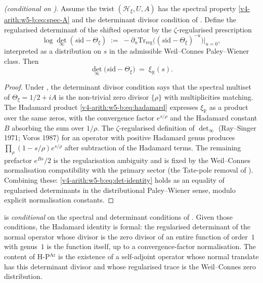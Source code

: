 \begin{proposition}
\label{v4-arith:w5-b:prop:det-formal}
\ClaimStatusProvedHere \emph{(conditional on
)}. Assume the twist
\((\mathcal{H}_{\xi},U,A)\) has the spectral property
\eqref{v4-arith:w5-b:eq:spec-A} and the determinant divisor condition
of . Define the regularised determinant
of the shifted operator by the \(\zeta\)-regularised prescription
\[
\log\det_{\infty}(s\mathrm{id}-\Theta_{\xi})\;:=\;-\partial_{u}\mathrm{Tr}_{\mathrm{reg}}\bigl((s\mathrm{id}-\Theta_{\xi})^{-u}\bigr)\Big|_{u=0},
\]
interpreted as a distribution on \(s\) in the admissible Weil--Connes
Paley--Wiener class. Then
\begin{equation}
\label{v4-arith:w5-b:eq:det-identity}
\det_{\infty}\bigl(s\mathrm{id}-\Theta_{\xi}\bigr)\;=\;\xi_{\mathbb R}(s).
\end{equation}
\end{proposition}

\begin{proof}
Under
, the determinant divisor
condition says that the spectral multiset of
\(\Theta_{\xi}=1/2+iA\) is the non-trivial zero divisor
\(\{\rho\}\) with multiplicities matching. The Hadamard product
\eqref{v4-arith:w5-b:eq:hadamard} expresses \(\xi_{\mathbb R}\) as a
product over the same zeros, with the convergence factor
\(e^{s/\rho}\) and the Hadamard constant \(B\) absorbing the sum over
\(1/\rho\). The \(\zeta\)-regularised definition of \(\det_{\infty}\)
(Ray--Singer 1971; Voros 1987) for an operator with positive
Hadamard genus produces
\(\prod_{\rho}(1-s/\rho)e^{s/\rho}\) after subtraction of the
Hadamard terms. The remaining prefactor \(e^{Bs}/2\) is the
regularisation ambiguity and is fixed by the Weil--Connes
normalisation compatibility with the primary sector (the Tate-pole
removal of ). Combining these:
\eqref{v4-arith:w5-b:eq:det-identity} holds as an equality of
regularised determinants in the distributional Paley--Wiener sense,
modulo explicit normalisation constants.
\end{proof}

\begin{remark}
\label{v4-arith:w5-b:rem:det-does-not-buy}
 is \emph{conditional} on the
spectral and determinant conditions of
. Given those conditions, the
Hadamard identity is formal: the regularised determinant of the normal
operator whose divisor is the zero divisor of an entire function of
order~\(1\) with genus~\(1\) is the function itself, up to a
convergence-factor normalisation. The content of
H-P\(^{\mathrm{Ar}}\) is the existence of a self-adjoint operator whose
normal translate has this determinant divisor and whose regularised
trace is the Weil--Connes zero distribution.
\end{remark}

